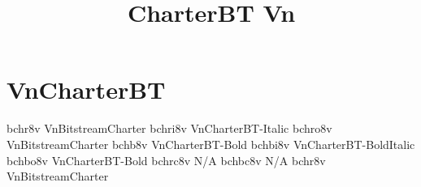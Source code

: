 \documentclass[sample]{vnsample}
\title{CharterBT Vn}
\begin{document}
\section{VnCharterBT}
  {bchr8v}   {VnBitstreamCharter}
 {bchri8v}  {VnCharterBT-Italic}
 {bchro8v}  {VnBitstreamCharter}
  {bchb8v}   {VnCharterBT-Bold}
 {bchbi8v}  {VnCharterBT-BoldItalic}
 {bchbo8v}  {VnCharterBT-Bold}
 {bchrc8v}  {N/A}
 {bchbc8v}  {N/A}
  {bchr8v}   {VnBitstreamCharter}
\end{document}

